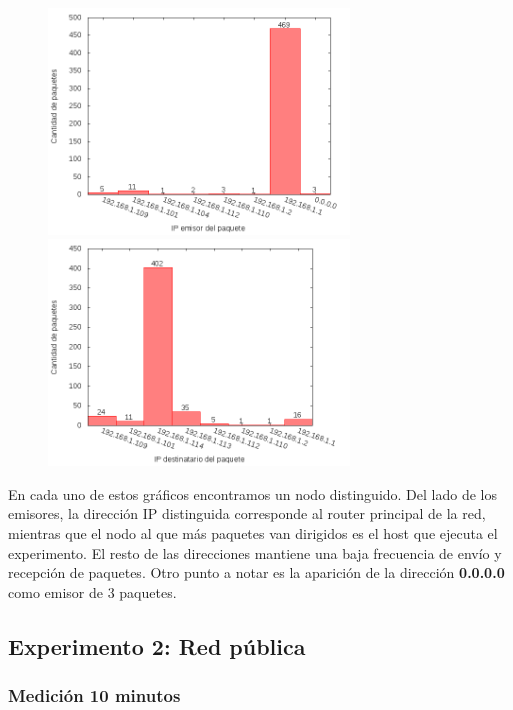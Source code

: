 \begin{figure}[!h]
\centering
\begin{minipage}{8cm}
  \centering
  \includegraphics[width=8cm]{../mediciones/home-wfi-10/home-wfi-10IpsSrcArp.png}
\end{minipage}%
\begin{minipage}{8cm}
  \centering
  \includegraphics[width=8cm]{../mediciones/home-wfi-10/home-wfi-10IpsDstArp.png}
\end{minipage}
\end{figure}

En cada uno de estos gráficos encontramos un nodo distinguido. Del lado de los emisores, la dirección IP distinguida corresponde al
router principal de la red, mientras que el nodo al que más paquetes van dirigidos es el host que ejecuta el experimento. El resto
de las direcciones mantiene una baja frecuencia de envío y recepción de paquetes. Otro punto a notar es la aparición de la dirección
\textbf{0.0.0.0} como emisor de 3 paquetes.

\subsection{Experimento 2: Red pública}
\subsubsection{Medición 10 minutos}

